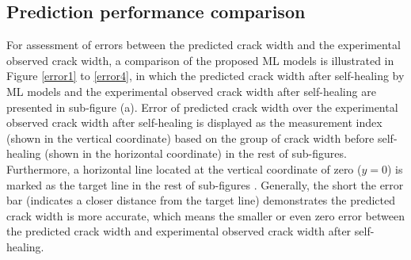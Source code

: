 \documentclass[11pt]{article}
\begin{document}
	
	\subsection{Prediction performance comparison}
For assessment of errors between the predicted crack width and the experimental observed crack width, a comparison of the proposed ML models     is illustrated in Figure \ref{error1} to \ref{error4}, in which the predicted crack width after self-healing by ML models and the experimental observed crack width after self-healing are presented in sub-figure (a). Error of predicted crack width over the experimental observed crack width after self-healing is displayed as the measurement index (shown in the vertical coordinate) based on the group of crack width before self-healing (shown in the horizontal coordinate) in the rest of sub-figures. Furthermore, a horizontal line located at the vertical coordinate of zero ($ y = 0$) is marked as the target line in the rest of sub-figures \cite{alshihri2009neural,yan2017evaluation}. Generally, the short the error bar (indicates a closer distance from the target line) demonstrates the predicted crack width is more accurate, which means the smaller or even zero error between the predicted crack width and experimental observed crack width after self-healing.
	
\end{document}

